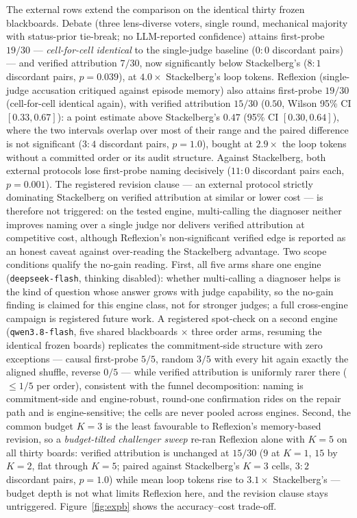 \documentclass[a4paper,fleqn]{cas-sc}
\begin{document}
The external rows extend the comparison on the identical thirty frozen
blackboards. Debate (three lens-diverse voters, single round, mechanical
majority with status-prior tie-break; no LLM-reported confidence) attains
first-probe $19/30$ --- \emph{cell-for-cell identical} to the single-judge
baseline ($0{:}0$ discordant pairs) --- and verified attribution $7/30$,
now significantly below Stackelberg's ($8{:}1$ discordant pairs,
$p=0.039$), at $4.0\times$ Stackelberg's loop tokens. Reflexion
(single-judge accusation critiqued against episode memory) also attains
first-probe $19/30$ (cell-for-cell identical again), with verified
attribution $15/30$ ($0.50$, Wilson 95\% CI $[0.33, 0.67]$): a point
estimate above Stackelberg's $0.47$ (95\% CI $[0.30, 0.64]$), where the
two intervals overlap over most of their range and the paired difference
is not significant ($3{:}4$ discordant pairs, $p=1.0$), bought at
$2.9\times$ the loop tokens without a committed order or its audit
structure. Against Stackelberg, both external protocols lose first-probe
naming decisively ($11{:}0$ discordant pairs each, $p=0.001$). The
registered revision clause --- an external protocol strictly dominating
Stackelberg on verified attribution at similar or lower cost --- is
therefore not triggered: on the tested engine, multi-calling the
diagnoser neither improves naming over a single judge nor delivers
verified attribution at competitive cost, although Reflexion's
non-significant verified edge is reported as an honest caveat against
over-reading the Stackelberg advantage. Two scope conditions qualify the
no-gain reading. First, all five arms share one engine
(\texttt{deepseek-flash}, thinking disabled): whether multi-calling a
diagnoser helps is the kind of question whose answer grows with judge
capability, so the no-gain finding is claimed for this engine class, not
for stronger judges; a full cross-engine campaign is registered future
work. A registered spot-check on a second engine
(\texttt{qwen3.8-flash}, five shared blackboards $\times$ three order
arms, resuming the identical frozen boards) replicates the
commitment-side structure with zero exceptions --- causal first-probe
$5/5$, random $3/5$ with every hit again exactly the aligned shuffle,
reverse $0/5$ --- while verified attribution is uniformly rarer there
($\le 1/5$ per order), consistent with the funnel decomposition: naming
is commitment-side and engine-robust, round-one confirmation rides on the
repair path and is engine-sensitive; the cells are never pooled across
engines.
Second, the common budget $K{=}3$ is the least favourable to Reflexion's
memory-based revision, so a \emph{budget-tilted challenger sweep} re-ran
Reflexion alone with $K{=}5$ on all thirty boards: verified attribution is
unchanged at $15/30$ ($9$ at $K{=}1$, $15$ by $K{=}2$, flat through
$K{=}5$; paired against Stackelberg's $K{=}3$ cells, $3{:}2$ discordant
pairs, $p=1.0$) while mean loop tokens rise to $3.1\times$ Stackelberg's
--- budget depth is not what limits Reflexion here, and the revision
clause stays untriggered.
Figure~\ref{fig:expb} shows the accuracy--cost trade-off.
\end{document}
